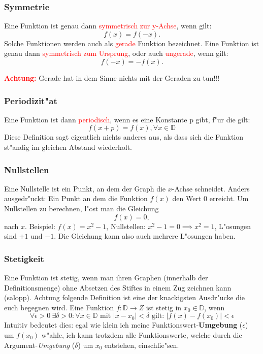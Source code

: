 \subsubsection{Symmetrie} \label{sec:symmetrie}
Eine Funktion ist genau dann \textcolor{red}{symmetrisch zur y-Achse}, wenn gilt:
\begin{equation*}
f(x)=f(-x).
\end{equation*}
Solche Funktionen werden auch als \textcolor{red}{gerade} Funktion bezeichnet. Eine Funktion ist genau dann \textcolor{red}{symmetrisch zum Ursprung}, oder auch \textcolor{red}{ungerade}, wenn gilt:
\begin{equation*}
f(-x)=-f(x).
\end{equation*}
\begin{center}
\textbf{\textcolor{red}{Achtung:}} Gerade hat in dem Sinne nichts mit der Geraden zu tun!!!
\end{center}

\subsubsection{Periodizit"at}
Eine Funktion ist dann \textcolor{red}{periodisch}, wenn es eine Konstante p gibt, f"ur die gilt:
\begin{equation*}
f(x+p) = f(x), \forall x\in\mathbb{D}
\end{equation*}
Diese Definition sagt eigentlich nichts anderes aus, als dass sich die Funktion st"andig im gleichen Abstand wiederholt.

\subsubsection{Nullstellen} \label{sec:nullstellen}
Eine Nullstelle ist ein Punkt, an dem der Graph die $x$-Achse schneidet. Anders ausgedr"uckt: Ein Punkt an dem die Funktion $f(x)$ den Wert $0$ erreicht. Um Nullstellen zu berechnen, l"ost man die Gleichung
\begin{equation*}
f(x) = 0,
\end{equation*}
nach $x$. Beispiel: $f(x)=x^2-1$, Nullstellen: $x^2-1=0\implies x^2=1$, L"osungen sind $+1$ und $-1$. Die Gleichung kann also auch mehrere L"osungen haben.

\subsubsection{Stetigkeit}
Eine Funktion ist stetig, wenn man ihren Graphen (innerhalb der Definitionsmenge) ohne Absetzen des Stiftes in einem Zug zeichnen kann (salopp). Achtung folgende Definition ist eine der knackigsten Ausdr"ucke die euch begegnen wird. Eine Funktion $f : \mathbb{D} \to Z$ ist stetig in $x_0 \in \mathbb{D}$, wenn
\begin{equation*}
\forall \epsilon > 0 \ \exists \delta > 0 : \forall x \in \mathbb{D} \text{ mit } \left|x - x_0 \right| < \delta \text{ gilt: } \left| f(x) - f(x_0) \right| < \epsilon 
\end{equation*}
Intuitiv bedeutet dies: egal wie klein ich meine Funktionswert-\textbf{Umgebung} ($\epsilon$) um $f(x_0)$ w"ahle, ich kann trotzdem alle Funktionswerte, welche durch die Argument-\textit{Umgebung} ($\delta$) um $x_0$ entstehen, einschlie"sen.

